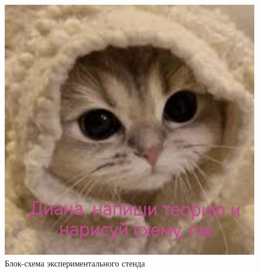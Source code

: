 \documentclass[a4paper, 12pt]{article}
\begin{document}
\begin{figure}[H]
        \centering
        \includegraphics[scale=0.3]{./pics/setup_sh.jpg}
        \caption{Блок-схема экспериментального стенда}
        \label{ris:setup_sh}
\end{figure}
\end{document}
